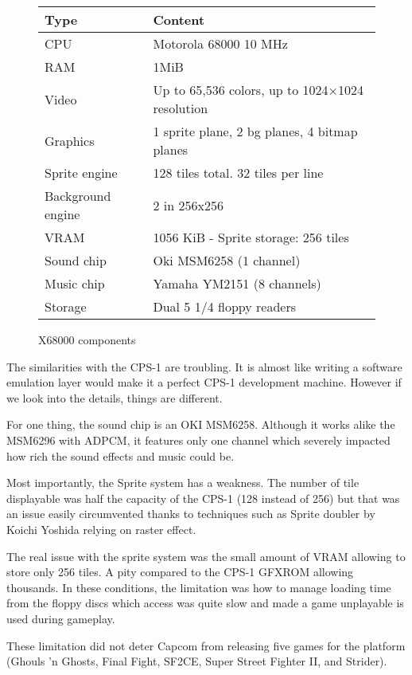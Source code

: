  \begin{figure}[H]
\begin{tabularx}{\textwidth}{lX}
  \toprule    
  \textbf{Type } & \textbf{ Content } \\  
  \toprule   
    
CPU & Motorola 68000 10 MHz \\  
RAM & 1MiB \\ 
Video  & Up to 65,536 colors, up to 1024×1024 resolution \\
Graphics & 1 sprite plane, 2 bg planes, 4 bitmap planes\\
Sprite engine & 128 tiles total. 32 tiles per line\\
Background engine & 2 in 256x256 \\
VRAM & 1056 KiB - Sprite storage: 256 tiles\\
Sound chip & Oki MSM6258 (1 channel)  \\ 
Music chip & Yamaha YM2151 (8 channels)  \\ 
Storage & Dual 5 1/4 floppy readers  \\ 
  \toprule   
\end{tabularx}
\caption*{X68000 components}
\end{figure}

The similarities with the CPS-1 are troubling. It is almost like writing a software emulation layer would make it a perfect CPS-1 development machine. However if we look into the details, things are different.

For one thing, the sound chip is an OKI MSM6258. Although it works alike the MSM6296 with ADPCM, it features only one channel which severely impacted how rich the sound effects and music could be.

Most importantly, the Sprite system has a weakness. The number of tile displayable was half the capacity of the CPS-1 (128 instead of 256) but that was an issue easily circumvented thanks to techniques such as Sprite doubler by Koichi Yoshida\cite{x68000spritedoubler} relying on raster effect.

The real issue with the sprite system was the small amount of VRAM allowing to store only 256 tiles. A pity compared to the CPS-1 GFXROM allowing thousands. In these conditions, the limitation was how to manage loading time from the floppy discs which access was quite slow and made a game unplayable is used during gameplay.

\pagebreak

These limitation did not deter Capcom from releasing five games for the platform (Ghouls 'n Ghosts, Final Fight, SF2CE, Super Street Fighter II, and Strider). 

